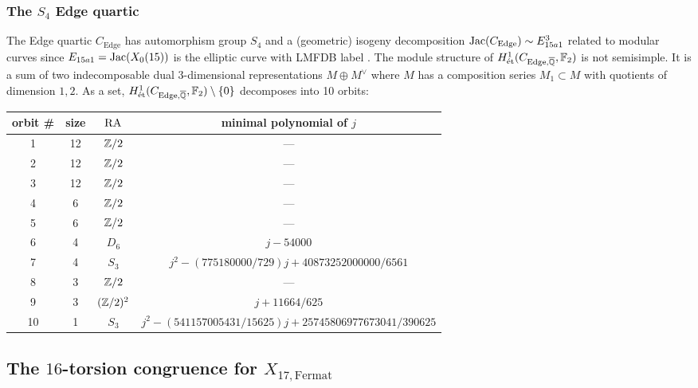 \documentclass[main.tex]{subfiles}
\begin{document}
\subsubsection{The $S_4$ Edge quartic}

The Edge quartic $C_{\mathrm{Edge}}$ has automorphism group $S_4$ and a (geometric) isogeny decomposition $\operatorname{\mathrm{Jac}}(C_{\mathrm{Edge}}) \sim E_{15a1}^3$ related to modular curves since $E_{15a1} = \operatorname{\mathrm{Jac}}(X_0(15))$ is the elliptic curve with LMFDB label \cite{lmfdb:ec-15.a5}. The module structure of $H^1_{\mathrm{\acute{e}t}}(C_{\mathrm{Edge}, \overline{\mathbb{Q}}}, \mathbb{F}_2)$ is not semisimple. It is a sum of two indecomposable dual $3$-dimensional representations $M \oplus M^{\vee}$ where $M$ has a composition series $M_1 \subset M$ with quotients of dimension $1,2$. As a set, $H^1_{\mathrm{\acute{e}t}}(C_{\mathrm{Edge}, \overline{\mathbb{Q}}}, \mathbb{F}_2) \setminus \{ 0 \}$ decomposes into 10 orbits:
\begin{center} \label{table:Edge_orbits}
\begin{tabular}{c|c|c|c}
orbit \# & size & $\operatorname{\mathrm{RA}}$ & minimal polynomial of $j$
\\
\hline
1 & 12 & $\mathbb{Z} /2$ & ---
\\
2 & 12 & $\mathbb{Z} /2$ & ---
\\
3 & 12 & $\mathbb{Z} /2$ & ---
\\
4 & 6 & $\mathbb{Z} /2$ & ---
\\
5 & 6 & $\mathbb{Z} /2$ & ---
\\
6 & 4 & $D_6$ & $j - 54000$
\\
7 & 4 & $S_3$ & $j^2 - (775180000/729)j + 40873252000000/6561$
\\
8 & 3 & $\mathbb{Z} /2$ & ---
\\
9 & 3 & $(\mathbb{Z} /2)^2$ & $j + 11664/625$
\\
10 & 1 & $S_3$ & $j^2 - (541157005431/15625) j + 25745806977673041/390625$
\end{tabular}
\end{center}

\subsection{The $16$-torsion congruence for $X_{17, \mathrm{Fermat}}$} \label{sec:17_Fermat}
\end{document}
